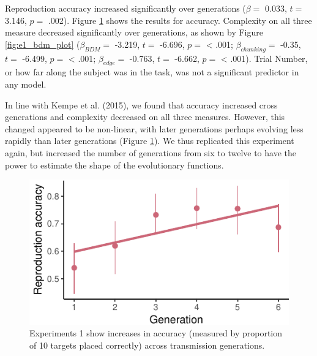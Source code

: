 \documentclass[10pt, letterpaper]{article}
\newenvironment{CodeChunk}{}{}
\begin{document}
Reproduction accuracy increased significantly over generations
(\(\beta =\) 0.033, \(t =\) 3.146, \(p =\) .002). Figure
\ref{fig:e1_acc_plot} shows the results for accuracy. Complexity on all
three measure decreased significantly over generations, as shown by
Figure \ref{fig:e1_bdm_plot} (\(\beta_{BDM} =\) -3.219, \(t =\) -6.696,
\(p =\) \textless{} .001; \(\beta_{chunking} =\) -0.35, \(t =\) -6.499,
\(p =\) \textless{} .001; \(\beta_{edge} =\) -0.763, \(t =\) -6.662,
\(p =\) \textless{} .001). Trial Number, or how far along the subject
was in the task, was not a significant predictor in any model.

In line with Kempe et al. (2015), we found that accuracy increased cross
generations and complexity decreased on all three measures. However,
this changed appeared to be non-linear, with later generations perhaps
evolving less rapidly than later generations (Figure
\ref{fig:e1_acc_plot}). We thus replicated this experiment again, but
increased the number of generations from six to twelve to have the power
to estimate the shape of the evolutionary functions.

\begin{CodeChunk}
\begin{figure}[tb]

{\centering \includegraphics{figs/e1_acc_plot-1} 

}

\caption[Experiments 1 show increases in accuracy (measured by proportion of 10 targets placed correctly) across transmission generations]{Experiments 1 show increases in accuracy (measured by proportion of 10 targets placed correctly) across transmission generations.}\label{fig:e1_acc_plot}
\end{figure}
\end{CodeChunk}
\end{document}
